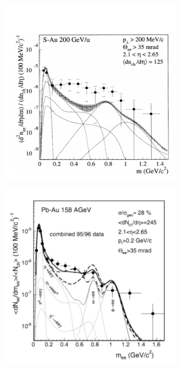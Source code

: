 \begin{figure}[htb]
    \centering
    \begin{subfigure}[b]{0.47\textwidth}
        \centering
        \includegraphics[width=\textwidth,clip]{figures/Chapter1/NA45SAu.png}
        \caption{}
        \label{fig:NA45SAu}
    \end{subfigure}
    \hfill
    \begin{subfigure}[b]{0.47\textwidth}
        \centering
        \includegraphics[width=\textwidth,clip]{figures/Chapter1/NA45PbAu.png}

\end{subfigure}
\end{figure}
